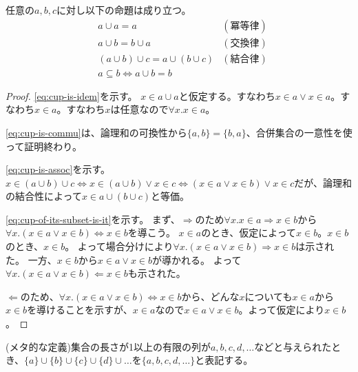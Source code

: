 \documentclass[uplatex,papersize,dvipdfmx]{jsarticle}
\begin{document}
    \begin{theorem}
      任意の$a, b, c$に対し以下の命題は成り立つ。
      \begin{align}
        &a \cup a = a &(冪等律) \label{eq:cup-is-idem}\\
        &a \cup b = b \cup a &(交換律) \label{eq:cup-is-commu}\\
        &(a \cup b) \cup c = a \cup (b \cup c) &(結合律) \label{eq:cup-is-assoc}\\
        &a \subseteq b \Leftrightarrow a \cup b = b\label{eq:cup-of-its-subset-is-it}
      \end{align}
      \begin{proof}
        \eqref{eq:cup-is-idem}を示す。
        $x \in a \cup a$と仮定する。すなわち$x \in a \lor x \in a$。すなわち$x \in a$。すなわち$x$は任意なので$\forall x. x \in a$。

        \eqref{eq:cup-is-commu}は、論理和の可換性から$\{a, b\} = \{b, a\}$、合併集合の一意性を使って証明終わり。

        \eqref{eq:cup-is-assoc}を示す。$x \in (a \cup b) \cup c \iff x \in (a \cup b) \lor x \in c \iff (x \in a \lor x \in b) \lor x \in c$だが、論理和の結合性によって$x \in a \cup (b \cup c)$と等価。

        \eqref{eq:cup-of-its-subset-is-it}を示す。
        まず、$\Rightarrow$のため$\forall x. x \in a \Rightarrow x \in b$から$\forall x. (x \in a \lor x \in b) \Leftrightarrow x \in b$を導こう。
        $x \in a$のとき、仮定によって$x \in b$。$x \in b$のとき、$x \in b$。
        よって場合分けにより$\forall x. (x \in a \lor x \in b) \Rightarrow x \in b$は示された。
        一方、$x \in b$から$x \in a \lor x \in b$が導かれる。
        よって$\forall x. (x \in a \lor x \in b) \Leftarrow x \in b$も示された。

        $\Leftarrow$のため、$\forall x. (x \in a \lor x \in b) \Leftrightarrow x \in b$から、どんな$x$についても$x \in a$から$x \in b$を導けることを示すが、$x \in a$なので$x \in a \lor x \in b$。よって仮定により$x \in b$。
      \end{proof}
    \end{theorem}
    \begin{definition}[集合の外延的記法]
      (メタ的な定義)集合の長さが1以上の有限の列が$a, b, c, d, \dots$などと与えられたとき、$\{a\} \cup \{b\} \cup \{c\} \cup \{d\} \cup \dots$を$\{a, b, c, d, \dots\}$と表記する。
    \end{definition}
\end{document}
